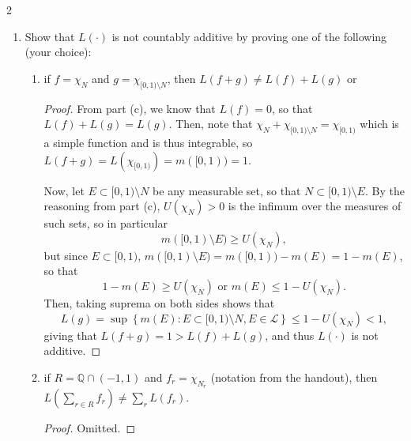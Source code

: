 \documentclass[11pt]{article}
\begin{document}
\begin{problem}{2}
\begin{enumerate}[label=(\alph*)]
\begin{proof}
\end{proof}
  \item Show that \( L(\cdot) \) is not countably additive by proving one of the following (your choice):
        \begin{enumerate}[label=(\roman*)]
          \item if \( f = \chi_N \) and \( g = \chi_{[0,1)\setminus N} \), then \( L(f + g) \neq L(f) + L(g) \) or
                \begin{proof}
                  From part (c), we know that \( L(f) = 0 \), so that \( L(f) + L(g) = L(g) \).
                  Then, note that \(\chi_N + \chi_{[0,1)\setminus N} = \chi_{[0,1)}\) which is a simple function and is thus integrable, so \( L(f+g)= L(\chi_{[0,1)}) = m([0,1)) = 1 \).

                  Now, let \( E \subset [0,1) \setminus N \) be any measurable set, so that \( N \subset [0,1) \setminus E \).
                  By the reasoning from part (c), \( U(\chi_N) > 0 \) is the infimum over the measures of such sets, so in particular
                  \begin{equation}
                  \label{eq:9}
                  m([0,1) \setminus E) \geq U(\chi_{N}),
                \end{equation}
                but since \( E \subset [0,1) \), \( m([0,1) \setminus E) = m([0,1)) - m(E) = 1 - m(E) \), so that
                \begin{equation}
                \label{eq:10}
                1 - m(E) \geq U(\chi_{N}) \text{ or } m(E) \leq 1 - U(\chi_N).
              \end{equation}
              Then, taking suprema on both sides shows that
              \begin{equation}
              \label{eq:13}
              L(g) = \sup \left\{ m(E): E \subset [0,1) \setminus N, E \in \mathcal{L} \right\} \leq 1 - U(\chi_N) < 1,
            \end{equation}
            giving that \( L(f+g) = 1 > L(f) + L(g) \), and thus \( L(\cdot) \) is not additive.
          \end{proof}
          \item if \( R = \mathbb{Q} \cap (-1,1) \) and \( f_r = \chi_{N_r} \) (notation from the handout), then \( L\left(\sum\limits_{r \in R} f_r\right) \neq \sum\limits_r L(f_r) \).
                \begin{proof}
                  Omitted.
                \end{proof}
        \end{enumerate}
\end{enumerate}
\end{problem}
\end{document}

